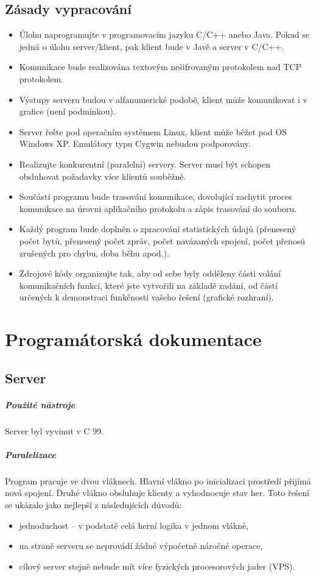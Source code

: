 \documentclass[12pt, a4paper]{report}
\begin{document}
\section{Zásady vypracování}
\begin{itemize}
	\item Úlohu naprogramujte v programovacím jazyku C/C++ anebo Java. Pokud se jedná o úlohu server/klient, pak klient bude v Javě a server v C/C++.
	\item Komunikace bude realizována textovým nešifrovaným protokolem nad TCP protokolem.
	\item Výstupy serveru budou v alfanumerické podobě, klient může komunikovat i v grafice (není podmínkou).
	\item Server řešte pod operačním systémem Linux, klient může běžet pod OS Windows XP. Emulátory typu Cygwin nebudou podporovány.
	\item Realizujte konkurentní (paralelní) servery. Server musí být schopen obsluhovat požadavky více klientů souběžně.
	\item Součástí programu bude trasování komunikace, dovolující zachytit proces komunikace na úrovni aplikačního protokolu a zápis trasování do souboru.
	\item Každý program bude doplněn o zpracování statistických údajů (přenesený počet bytů, přenesený počet zpráv, počet navázaných spojení, počet přenosů zrušených pro chybu, doba běhu apod.).
	\item Zdrojové kódy organizujte tak, aby od sebe byly odděleny části volání komunikačních funkcí, které jste vytvořili na základě zadání, od částí určených k demonstraci funkčnosti vašeho řešení (grafické rozhraní).
\end{itemize}

\chapter{Programátorská dokumentace}
\section{Server}

\paragraph{Použité nástroje} Server byl vyvinut v C 99.

\paragraph{Paralelizace}
Program pracuje ve dvou vláknech. Hlavní vlákno po inicializaci prostředí přijímá nová spojení. Druhé vlákno obsluhuje klienty a vyhodnocuje stav her. Toto řešení se ukázalo jako nejlepší z následujících důvodů:
\begin{itemize}
	\item jednoduchost -- v podstatě celá herní logika v jednom vlákně,
	\item na straně serveru se neprovádí žádné výpočetně náročné operace,
	\item cílový server stejně nebude mít více fyzických procesorových jader (VPS).
\end{itemize}
\end{document}

